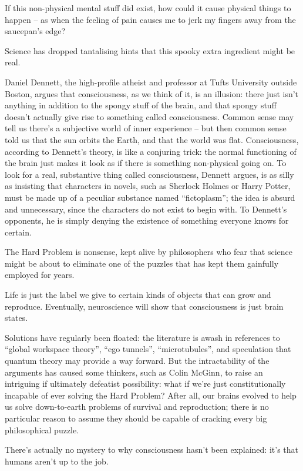\documentclass[
]{book}
\begin{document}
If this non-physical mental stuff did exist, how could it cause physical things to happen -- as when the feeling of pain causes me to jerk my fingers away from the saucepan's edge?

Science has dropped tantalising hints that this spooky extra ingredient might be real.

Daniel Dennett, the high-profile atheist and professor at Tufts University outside Boston, argues that consciousness, as we think of it, is an illusion: there just isn't anything in addition to the spongy stuff of the brain, and that spongy stuff doesn't actually give rise to something called consciousness. Common sense may tell us there's a subjective world of inner experience -- but then common sense told us that the sun orbits the Earth, and that the world was flat. Consciousness, according to Dennett's theory, is like a conjuring trick: the normal functioning of the brain just makes it look as if there is something non-physical going on. To look for a real, substantive thing called consciousness, Dennett argues, is as silly as insisting that characters in novels, such as Sherlock Holmes or Harry Potter, must be made up of a peculiar substance named ``fictoplasm''; the idea is absurd and unnecessary, since the characters do not exist to begin with.
To Dennett's opponents, he is simply denying the existence of something everyone knows for certain.

The Hard Problem is nonsense, kept alive by philosophers who fear that science might be about to eliminate one of the puzzles that has kept them gainfully employed for years.

Life is just the label we give to certain kinds of objects that can grow and reproduce.
Eventually, neuroscience will show that consciousness is just brain states.

Solutions have regularly been floated: the literature is awash in references to ``global workspace theory'', ``ego tunnels'', ``microtubules'', and speculation that quantum theory may provide a way forward. But the intractability of the arguments has caused some thinkers, such as Colin McGinn, to raise an intriguing if ultimately defeatist possibility: what if we're just constitutionally incapable of ever solving the Hard Problem? After all, our brains evolved to help us solve down-to-earth problems of survival and reproduction; there is no particular reason to assume they should be capable of cracking every big philosophical puzzle.

There's actually no mystery to why consciousness hasn't been explained: it's that humans aren't up to the job.
\end{document}
